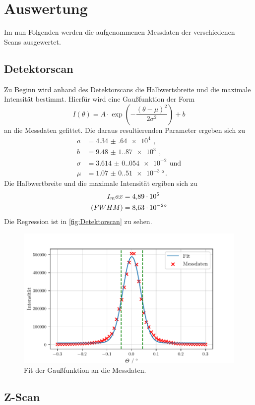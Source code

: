 \section{Auswertung}
\label{sec:Auswertung}

Im nun Folgenden werden die aufgenommenen Messdaten der verschiedenen Scans ausgewertet. 


\subsection{Detektorscan}
\label{sec:Detektorscan}

Zu Beginn wird anhand des Detektorscans die Halbwertsbreite und die maximale Intensität bestimmt.
Hierfür wird eine Gaußfunktion der Form
\begin{equation}
    I(\theta)= A \cdot \exp \left(-\frac{(\theta-\mu)^2}{2 \sigma^2}\right)+b
\end{equation}
an die Messdaten gefittet.
Die daraus resultierenden Parameter ergeben sich zu 
\begin{align*}
    a & = \qty{4.34(64)e4}{} \, , \\
    b & = \qty{9.48(1.87)e3}{} \, , \\
    \sigma & = \qty{3.614(0.054)e-2}{} \, \text{und} \\
    \mu & = \qty{1.07(0.51)e-3}{\degree} \, .
\end{align*}
Die Halbwertbreite und die maximale Intensität ergiben sich zu
\begin{align*}
    I_max &= \qty{4.89e5}{} \\
    \text(FWHM) &= \qty{8.63e-2}{\degree}
\end{align*}
Die Regression ist in \autoref{fig:Detektorscan} zu sehen.
\begin{figure}
    \centering
    \includegraphics[width = 0.5 \linewidth]{build/Detektorscan.pdf}
    \caption{Fit der Gaußfunktion an die Messdaten.}
    \label{fig:Detektorscan}
\end{figure}

\subsection{Z-Scan}

